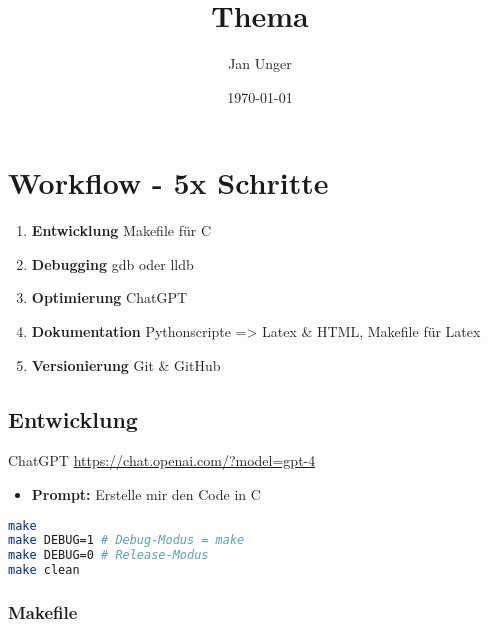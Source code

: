 \documentclass{vorlage-design-main}
\title{Thema}
\author{Jan Unger}
\date{\today}
\begin{document}
\maketitle

\begin{abstract}

\end{abstract}

\hypertarget{workflow---5x-schritte}{%
\section{Workflow - 5x Schritte}\label{workflow---5x-schritte}}

\begin{enumerate}
\def\labelenumi{\arabic{enumi}.}

\item
  \textbf{Entwicklung} Makefile für C
\item
  \textbf{Debugging} gdb oder lldb
\item
  \textbf{Optimierung} ChatGPT
\item
  \textbf{Dokumentation} Pythonscripte =\textgreater{} Latex \& HTML,
  Makefile für Latex
\item
  \textbf{Versionierung} Git \& GitHub
\end{enumerate}

\hypertarget{entwicklung}{%
\subsection{Entwicklung}\label{entwicklung}}

ChatGPT \url{https://chat.openai.com/?model=gpt-4}

\begin{itemize}

\item
  \textbf{Prompt:} Erstelle mir den Code in C
\end{itemize}

\begin{lstlisting}[language=bash]
make
make DEBUG=1 # Debug-Modus = make
make DEBUG=0 # Release-Modus
make clean
\end{lstlisting}

\hypertarget{makefile}{%
\subsubsection{Makefile}\label{makefile}}
\end{document}
